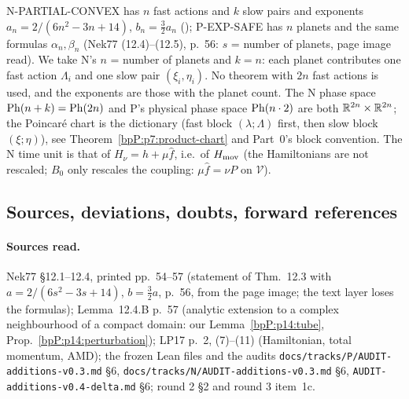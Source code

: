 \begin{remark}\label{bpP:p14:index}
N-PARTIAL-CONVEX has $n$ fast actions and $k$ slow pairs and exponents $a_n=2/(6n^2-3n+14)$, $b_n=\frac32a_n$ (); P-EXP-SAFE has $n$ planets and the same formulas $\alpha_n,\beta_n$ (Nek77 (12.4)--(12.5), p.~56: $s$ = number of planets, page image read). We take N's $n$ = number of planets and $k=n$: each planet contributes one fast action $\Lambda_i$ and one slow pair $(\xi_i,\eta_i)$. No theorem with $2n$ fast actions is used, and the exponents are those with the planet count. The N phase space $\mathrm{Ph}(n+k)=\mathrm{Ph}(2n)$ and P's physical phase space $\mathrm{Ph}(n\cdot 2)$ are both $\mathbb{R}^{2n}\times\mathbb{R}^{2n}$; the Poincar\'e chart is the dictionary (fast block $(\lambda;\Lambda)$ first, then slow block $(\xi;\eta)$), see Theorem~\ref{bpP:p7:product-chart} and Part~0's block convention. The N time unit is that of $H_\nu=h+\mu\hat f$, i.e.\ of $H_{\rm mov}$ (the Hamiltonians are not rescaled; $B_0$ only rescales the coupling: $\mu\hat f=\nu P$ on $\mathcal V$).
\end{remark}

\subsection{Sources, deviations, doubts, forward references}\label{bpP:p14:notes}

\paragraph{Sources read.} Nek77 \S12.1--12.4, printed pp.~54--57 (statement of Thm.~12.3 with $a=2/(6s^2-3s+14)$, $b=\frac32a$, p.~56, from the page image; the text layer loses the formulas); Lemma~12.4.B p.~57 (analytic extension to a complex neighbourhood of a compact domain: our Lemma~\ref{bpP:p14:tube}, Prop.~\ref{bpP:p14:perturbation}); LP17 p.~2, (7)--(11) (Hamiltonian, total momentum, AMD); the frozen Lean files and the audits \texttt{docs/tracks/P/AUDIT-additions-v0.3.md} \S6, \texttt{docs/tracks/N/AUDIT-additions-v0.3.md} \S6, \texttt{AUDIT-additions-v0.4-delta.md} \S6; round 2 \S2 and round 3 item~1c.

